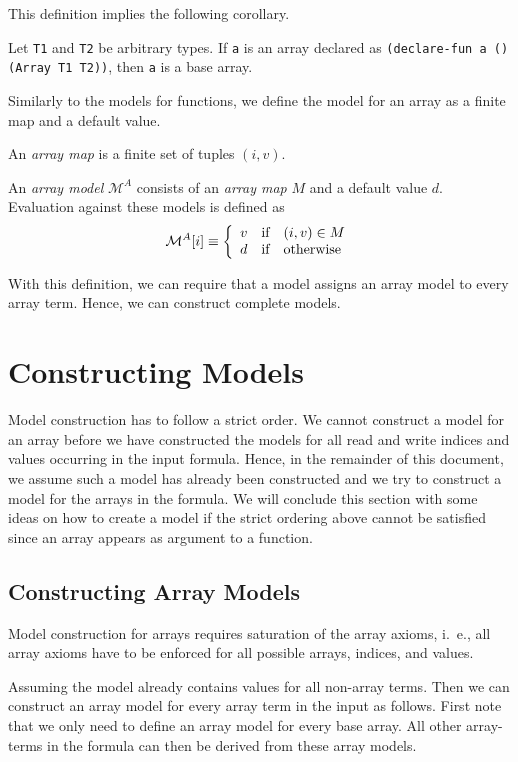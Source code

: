 \documentclass[a4paper,12pt]{article}
\newcommand\m{\mathcal{M}}
\newcommand\ma{\ensuremath{\m^A}\xspace}
\begin{document}
This definition implies the following corollary.
\begin{corollary}
  Let \verb|T1| and \verb|T2| be arbitrary types.  If \verb|a| is an array
  declared as \verb|(declare-fun a () (Array T1 T2))|, then \verb|a| is a base
  array.
\end{corollary}

Similarly to the models for functions, we define the model for an array as a
finite map and a default value.  
%
\begin{defn}
  An \emph{array map} is a finite set of tuples $(i,v)$.
\end{defn}
%
\begin{defn}
  An \emph{array model} \ma consists of an \emph{array map} $M$ and a default
  value $d$.  Evaluation against these models is defined as
  \[
  \ma[i] \equiv \left\{\begin{array}{l@{\quad\mbox{if}\quad}l} v & (i,v)\in
  M\\ d & \mbox{otherwise}\end{array}\right.
  \]
\end{defn}

With this definition, we can require that a model assigns an array model to
every array term.  Hence, we can construct complete models.

\section{Constructing Models}
Model construction has to follow a strict order.  We cannot construct a model
for an array before we have constructed the models for all read and write
indices and values occurring in the input formula.  Hence, in the remainder of
this document, we assume such a model has already been constructed and we try
to construct a model for the arrays in the formula.  We will conclude this
section with some ideas on how to create a model if the strict ordering above
cannot be satisfied since an array appears as argument to a function.

\subsection{Constructing Array Models}
Model construction for arrays requires saturation of the array axioms, i.~e.,
all array axioms have to be enforced for all possible arrays, indices, and values.

Assuming the model already contains values for all non-array terms.  Then we
can construct an array model for every array term in the input as follows.
First note that we only need to define an array model for every base array.
All other array-terms in the formula can then be derived from these array
models.
\end{document}
